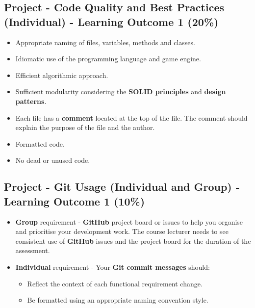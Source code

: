 \documentclass{article}
\begin{document}
\subsection*{Project - Code Quality and Best Practices (Individual) - Learning Outcome 1 (20\%)}
\begin{itemize}
    \item Appropriate naming of files, variables, methods and classes.
    \item Idiomatic use of the programming language and game engine.
    \item Efficient algorithmic approach.
    \item Sufficient modularity considering the \textbf{SOLID principles} and \textbf{design patterns}.
    \item Each file has a \textbf{comment} located at the top of the file. The comment should explain the purpose of the file and the author.
    \item Formatted code.
    \item No dead or unused code.
\end{itemize} 

\subsection*{Project - Git Usage (Individual and Group) - Learning Outcome 1 (10\%)}
\begin{itemize}
	\item \textbf{Group} requirement - \textbf{GitHub} project board or issues to help you organise and prioritise your development work. The course lecturer needs to see consistent use of \textbf{GitHub} issues and the project board for the duration of the assessment. 
	\item \textbf{Individual} requirement - Your \textbf{Git commit messages} should:
    \begin{itemize}
      \item Reflect the context of each functional requirement change.
      \item Be formatted using an appropriate naming convention style. 
    \end{itemize}
\end{itemize}
\end{document}
